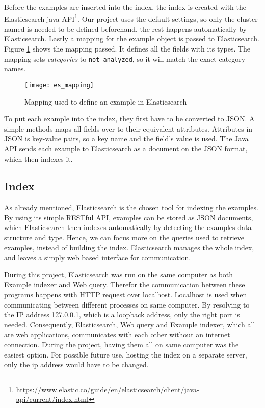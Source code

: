 Before the examples are inserted into the index, the index is created with the Elasticsearch java API\footnote{\url{https://www.elastic.co/guide/en/elasticsearch/client/java-api/current/index.html}}. Our project uses the default settings, so only the cluster named is needed to be defined beforehand, the rest happens automatically by Elasticsearch. Lastly a mapping for the example object is passed to Elasticsearch. Figure \ref{fig:es_mapping} shows the mapping passed. It defines all the fields with its types. The mapping sets \textit{categories} to \texttt{not\_analyzed}, so it will match the exact category names.

\begin{figure}[H] 
\caption{Mapping used to define an example in Elasticsearch}
\centering
\texttt{[image: es\_mapping]}
\label{fig:es_mapping}
\end{figure}

To put each example into the index, they first have to be converted to JSON. A simple methods maps all fields over to their equivalent attributes. Attributes in JSON is key-value pairs, so a key name and the field's value is used. The Java API sends each example to Elasticsearch as a document on the JSON format, which then indexes it.

\subsection{Index}
As already mentioned, Elasticsearch is the chosen tool for indexing the examples. By using its simple RESTful API, examples can be stored as JSON documents, which Elasticsearch then indexes automatically by detecting the examples data structure and type. Hence, we can focus more on the queries used to retrieve examples, instead of building the index. Elasticsearch manages the whole index, and leaves a simply web based interface for communication.

During this project, Elasticsearch was run on the same computer as both Example indexer and Web query. Therefor the communication between these programs happens with HTTP request over localhost. Localhost is used when communicating between different processes on same computer. By resolving to the IP address 127.0.0.1, which is a loopback address, only the right port is needed. Consequently, Elasticsearch, Web query and Example indexer, which all are web applications, communicates with each other without an internet connection. During the project, having them all on same computer was the easiest option. For possible future use, hosting the index on a separate server, only the ip address would have to be changed.

